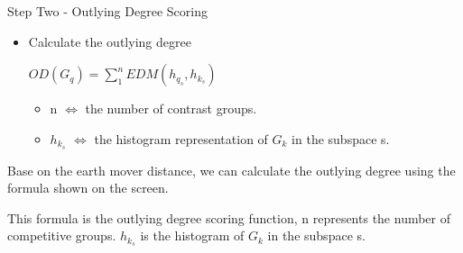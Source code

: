 \documentclass[
size=14pt,
paper=smartboard,  %
mode=present, 		%
display=slides, 	%
style=tuliplab,  	%
pauseslide,
fleqn,leqno]{powerdot}
\begin{document}
\begin{slide}[toc=,bm=]{Step Two - Outlying Degree Scoring}
	
	\begin{itemize}
		\item
		Calculate the outlying degree
		
		\vspace{1.2cm}
		
		\begin{centering}
			
			$ OD(G_q) = \sum_{1}^{n}EDM(h_{q_s}, h_{k_s}) $
			
		\end{centering}
		
		\begin{itemize}
			\item
			n $\Leftrightarrow$ the number of contrast groups.
			
			\item
			$h_{k_s}$  $\Leftrightarrow$ the histogram representation of $G_k$ in the subspace s.
			
		\end{itemize}
	\end{itemize}
	
	\begin{note}
		Base on the earth mover distance,
		we can calculate the outlying degree using the formula shown on the screen.
		
		This formula is the outlying degree scoring function,
		n represents the number of competitive groups.
		$h_{k_s}$ is the histogram of $G_k$ in the subspace s.
	\end{note}
	
\end{slide}
\end{document}
